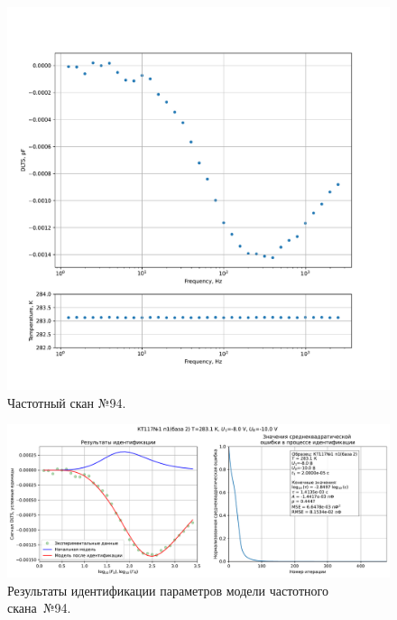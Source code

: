 \begin{figure}[!ht]
    \centering
    \includegraphics[width=1\textwidth]{../plots/КТ117№1_п1(база 2)_2500Гц-1Гц_1пФ_+10С_-8В-10В_20мВ_20мкс_шаг_0,1.pdf}
    \caption{Частотный скан №94.}
    \label{pic:frequency_scan_94}
\end{figure}

\begin{figure}[!ht]
    \centering
    \includegraphics[width=1\textwidth]{../plots/КТ117№1_п1(база 2)_2500Гц-1Гц_1пФ_+10С_-8В-10В_20мВ_20мкс_шаг_0,1_model.pdf}
    \caption{Результаты идентификации параметров модели частотного скана~№94.}
    \label{pic:frequency_scan_model94}
\end{figure}

\pagebreak


